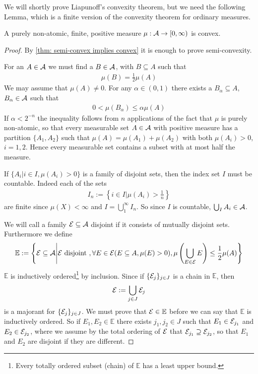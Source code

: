 \documentclass[../../main.tex]{subfiles}
\begin{document}
We will shortly prove Liapunoff's convexity theorem, but we need the following Lemma, which is a finite version of the convexity theorem for ordinary measures.

\begin{lemma}\label{lem: finite liapunoff}
A purely non-atomic, finite, positive measure $\mu:\mathcal{A}\to [0,\infty)$ is convex.
\end{lemma}
\begin{proof}
By \cref{thm: semi-convex implies convex} it is enough to prove semi-convexity.

For an $A\in \mathcal{A}$ we must find a $B\in \mathcal{A}$, with $B\subseteq A$ such that
\begin{align*}
	\mu(B)=\frac{1}{2}\mu(A)
\end{align*}
We may assume that $\mu(A)\neq 0$. For any $\alpha\in (0,1)$ there exists a $B_{\alpha}\subseteq A$, $B_{\alpha}\in \mathcal{A}$ such that
\begin{align}
	0< \mu(B_{\alpha}) \le \alpha\mu(A) \label{eq: B alpha}
\end{align}
If $\alpha< 2^{-n}$ the inequality follows from $n$ applications of the fact that $\mu$ is purely non-atomic, so that every measurable set $A\in \mathcal{A}$ with positive measure has a partition $\{A_{1}, A_{2}\}$ such that $\mu(A)=\mu(A_{1})+\mu(A_{2})$ with both $\mu(A_{i})>0$, $i=1,2$. Hence every measurable set contains a subset with at most half the measure.

If $\{A_{i}|i\in I, \mu(A_{i})>0\}$ is a family of disjoint sets, then the index set $I$ must be countable. Indeed each of the sets
\begin{align*}
	I_{n}:=\left\{i\in I | \mu(A_{i}) > \frac{1}{n} \right\}
\end{align*}
are finite since $\mu(X)<\infty$ and $I=\bigcup_{1}^{\infty}I_{n}$. So since $I$ is countable, $\bigcup_{I}A_{i}\in \mathcal{A}$.

We will call a family $\mathcal{E}\subseteq \mathcal{A}$ disjoint if it consists of mutually disjoint sets. Furthermore we define
\begin{align*}
	\mathbb{E}:=\left\{ \mathcal{E}\subseteq \mathcal{A} \middle| \mathcal{E} \text{ disjoint }, \forall E\in \mathcal{E} (E\subseteq A, \mu(E)>0), \mu\left( \bigcup_{E\in \mathcal{E}} E\right) \le \frac{1}{2}\mu(A) \right\}
\end{align*}
$\mathbb{E}$ is inductively ordered\footnote{Every totally ordered subset (chain) of $\mathbb{E}$ has a least upper bound.} by inclusion. Since if $\{\mathcal{E}_{j}\}_{j\in J}$ is a chain in $\mathbb{E}$, then
\begin{align*}
	\mathcal{E}:=\bigcup_{j\in J}\mathcal{E}_{j}
\end{align*}
is a majorant for $\{\mathcal{E}_{j}\}_{j\in J}$. We must prove that $\mathcal{E}\in \mathbb{E}$ before we can say that $\mathbb{E}$ is inductively ordered. So if $E_{1},E_{2}\in \mathbb{E}$ there exists $j_{1},j_{2}\in J$ such that $E_{1}\in \mathcal{E}_{j_{1}}$ and $E_{2}\in \mathcal{E}_{j_{2}}$, where we assume by the total ordering of $\mathcal{E}$ that $\mathcal{E}_{j_{1}} \supseteq \mathcal{E}_{j_{2}}$, so that $E_{1}$ and $E_{2}$ are disjoint if they are different.


\end{proof}
\end{document}
